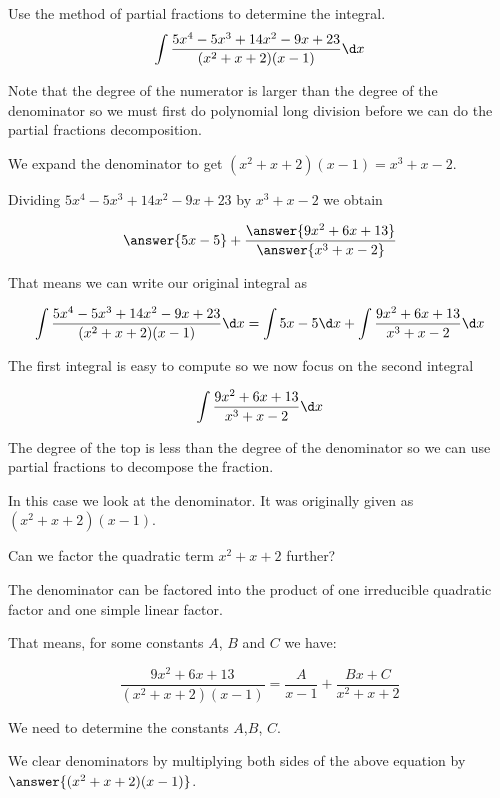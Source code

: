 \documentclass{ximera}
\author{Jason Miller}
\begin{document}
\begin{exercise}
Use the method of partial fractions to determine the integral.
\[
\int \frac{5x^{4}-5x^{3}+14x^{2}-9x+23}{(x^{2}+x+2)(x-1)} \d x
\]


Note that the degree of the numerator is larger than the degree of the denominator so we must first do polynomial 
long division before we can do the partial fractions decomposition. 

We expand the denominator to get 
$(x^{2}+x+2)(x-1)=x^{3}+x-2$. 

Dividing $5x^{4}-5x^{3}+14x^{2}-9x+23$ by $x^{3}+x-2$ we obtain

\[
\answer{ 5x-5}  + \frac{\answer{9x^{2}+6x+13}}{\answer{x^{3}+x-2}} 
\]


\begin{exercise}

That means we can write our original integral as

\[
\int \frac{5x^{4}-5x^{3}+14x^{2}-9x+23}{(x^{2}+x+2)(x-1)} \d x= \int 5x-5 \d x + \int \frac{9x^{2}+6x+13}{x^3+x-2} \d x
\]

The first integral is easy to compute so we now focus on the second integral 

\[
 \int \frac{9x^{2}+6x+13}{x^{3}+x-2} \d x
\]

The degree of the top is less than the degree of the denominator so we can use partial fractions to 
decompose the fraction. 


In this case we look at the denominator. It was originally given as $(x^{2}+x+2)(x-1)$. 

Can we factor the quadratic term $x^{2}+x+2$ further?


  \begin{multipleChoice}
  \end{multipleChoice}


\begin{exercise}

The denominator can be factored into the product of one irreducible quadratic factor and one simple linear factor. 

That means, for some constants $A$, $B$ and $C$ we have:

\[
\frac{9x^{2}+6x+13}{(x^{2}+x+2)(x-1)}= \frac{A}{x-1} + \frac{Bx+C}{x^{2}+x+2}
\]

We need to determine the constants $A$,$B$, $C$. 

We clear denominators by multiplying both sides of the above equation by $\answer{(x^{2}+x+2)(x-1)}$. 


\end{exercise}
\end{exercise}
\end{exercise}
\end{document}
